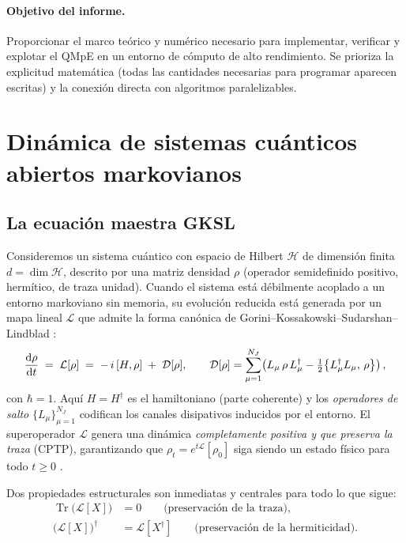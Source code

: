 \documentclass[11pt,a4paper]{article}
\theoremstyle{definition}
\theoremstyle{plain}
\newcommand{\Lop}{\mathcal{L}}
\newcommand{\Dop}{\mathcal{D}}
\newcommand{\Hs}{\mathcal{H}}
\renewcommand{\Tr}{\operatorname{Tr}}
\begin{document}
\paragraph{Objetivo del informe.} Proporcionar el marco teórico y numérico necesario para implementar,
verificar y explotar el QMpE en un entorno de cómputo de alto rendimiento. Se prioriza la explicitud
matemática (todas las cantidades necesarias para programar aparecen escritas) y la conexión directa con
algoritmos paralelizables.

\section{Dinámica de sistemas cuánticos abiertos markovianos}

\subsection{La ecuación maestra GKSL}

Consideremos un sistema cuántico con espacio de Hilbert $\Hs$ de dimensión finita $d=\dim\Hs$, descrito por
una matriz densidad $\rho$ (operador semidefinido positivo, hermítico, de traza unidad). Cuando el sistema
está débilmente acoplado a un entorno markoviano sin memoria, su evolución reducida está generada por un
mapa lineal $\Lop$ que admite la forma canónica de
Gorini--Kossakowski--Sudarshan--Lindblad \cite{GKS1976,Lindblad1976,BreuerPetruccione2002}:
\begin{equation}
\dv{\rho}{t} \;=\; \Lop[\rho]
\;=\; -\,i\,[H,\rho] \;+\; \Dop[\rho],
\qquad
\Dop[\rho]=\sum_{\mu=1}^{N_J}\!\left( L_\mu\,\rho\,L_\mu^{\dagger}
-\tfrac12\big\{L_\mu^{\dagger}L_\mu,\,\rho\big\}\right),
\label{eq:gksl}
\end{equation}
con $\hbar=1$. Aquí $H=H^{\dagger}$ es el hamiltoniano (parte coherente) y los \emph{operadores de salto}
$\{L_\mu\}_{\mu=1}^{N_J}$ codifican los canales disipativos inducidos por el entorno. El superoperador
$\Lop$ genera una dinámica \emph{completamente positiva y que preserva la traza} (CPTP), garantizando que
$\rho_t=e^{t\Lop}[\rho_0]$ siga siendo un estado físico para todo $t\ge0$ \cite{Carollo2021}.

Dos propiedades estructurales son inmediatas y centrales para todo lo que sigue:
\begin{align}
\Tr\!\big(\Lop[X]\big) &= 0 \qquad \text{(preservación de la traza)},\\
\big(\Lop[X]\big)^{\dagger} &= \Lop[X^{\dagger}] \qquad \text{(preservación de la hermiticidad)}.
\end{align}
\end{document}
